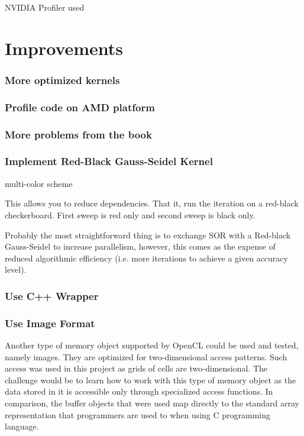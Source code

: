 NVIDIA Profiler used

\section{Improvements}
\subsubsection{More optimized kernels}


\subsubsection{Profile code on AMD platform}

\subsubsection{More problems from the book}


\subsubsection{Implement Red-Black Gauss-Seidel Kernel}

multi-color scheme

This allows you to reduce
dependencies. That it, run the iteration on a red-black checkerboard.
First sweep is  red only and second sweep is black only.

Probably the most straightforward thing is to exchange SOR with a
Red-black Gauss-Seidel to increase parallelism, however, this comes as the
expense of reduced algorithmic efficiency (i.e. more iterations to achieve
a given accuracy level). 

\subsubsection{Use C++ Wrapper}



\subsubsection{Use Image Format}
Another type of memory object supported by OpenCL could be used and tested, namely images. They are optimized for two-dimensional access patterns. Such access was used in this project as grids of cells are two-dimensional. The challenge would be to learn how to work with this type of memory object as the data stored in it is accessible only through specialized access functions. In comparison, the buffer objects that were used map directly to the standard array representation that programmers are used to when using C programming language.



